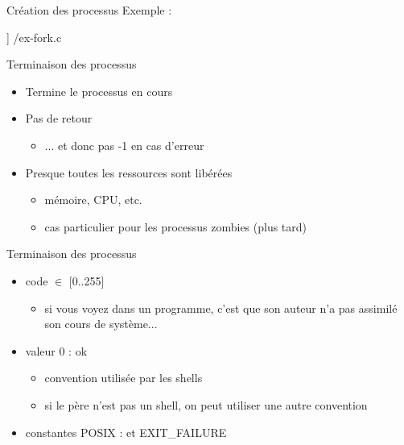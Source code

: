 \begin {frame} {Création des processus}
    Exemple :

    \fC\lstmonstyle] {\inc/ex-fork.c}
\end {frame}

\begin {frame} {Terminaison des processus}

    \begin {itemize}
	\item Termine le processus en cours
	\item Pas de retour
	    \begin {itemize}
		\item ... et donc pas -1 en cas d'erreur
	    \end {itemize}
	\item Presque toutes les ressources sont libérées
	    \begin {itemize}
		\item mémoire, CPU, etc.
		\item cas particulier pour les processus zombies (plus tard)
	    \end {itemize}
    \end {itemize}
\end {frame}

\begin {frame} {Terminaison des processus}

    \begin {block} {}
    \begin {itemize}
	\item code $\in$ [0..255]
	    \begin {itemize}
		\item si vous voyez  dans un
		    programme, c'est que son auteur n'a pas assimilé
		    son cours de système...
	    \end {itemize}
	\item valeur 0 : ok
	    \begin {itemize}
		\item convention utilisée par les shells
		\item si le père n'est pas un shell, on peut
		    utiliser une autre convention
	    \end {itemize}
	\item constantes POSIX :  et \code
	    {EXIT\_FAILURE}

    \end {itemize}
    \end {block}
\end {frame}

